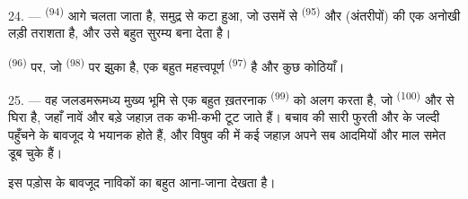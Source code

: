 \VUsaut{3.0mm}
\VUsaut{3.0mm}

24. ---  \textsuperscript{(94)} आगे चलता जाता है, समुद्र से कटा हुआ,
जो उसमें से  \textsuperscript{(95)} और  (अंतरीपों)
की एक अनोखी लड़ी तराशता है, और उसे बहुत सुरम्य बना देता है।

 \textsuperscript{(96)} पर, जो
 \textsuperscript{(98)} पर झुका है, एक बहुत महत्त्वपूर्ण  \textsuperscript{(97)}
है और कुछ कोठियाँ।

25. --- वह जलडमरूमध्य मुख्य भूमि से एक बहुत ख़तरनाक 
\textsuperscript{(99)} को अलग करता है, जो  \textsuperscript{(100)}
और  से घिरा है, जहाँ नावें और बड़े जहाज़ तक कभी-कभी टूट जाते
हैं। बचाव की सारी फुरती और  के जल्दी पहुँचने के बावजूद ये
 भयानक होते हैं, और विषुव की  में कई जहाज़
अपने सब आदमियों और माल समेत डूब चुके हैं।

इस पड़ोस के बावजूद  नाविकों का बहुत आना-जाना देखता है।
\VUsaut{6.0mm}
\VUfilet{22mm}
